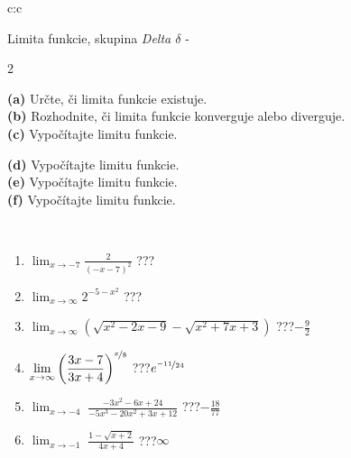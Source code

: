 \documentclass[10pt]{report}
\begin{document}
\begin{tabular}{c:c}
\begin{minipage}[c][104.5mm][t]{0.5\linewidth}
\begin{center}
\vspace{7mm}
{\huge Limita funkcie, skupina \textit{Delta $\delta$} -}\\[5mm]
\begin{minipage}{0.95\linewidth}
\begin{center}
{\small \begin{multicols}{2} \raggedright
\textbf{(a)} Určte, či limita funkcie existuje. \\[1mm]
\textbf{(b)} Rozhodnite, či limita funkcie konverguje alebo diverguje. \\[1mm]
\textbf{(c)} Vypočítajte limitu funkcie. \par \columnbreak
\textbf{(d)} Vypočítajte limitu funkcie. \\[1mm]
\textbf{(e)} Vypočítajte limitu funkcie. \\[1mm]
\textbf{(f)} Vypočítajte limitu funkcie. \\[1mm]
\end{multicols}
}
\end{center}
\end{minipage}
\\[4mm]
\begin{minipage}{0.79\linewidth}
\begin{center}
\begin{varwidth}{\linewidth}
\begin{enumerate}
\normalsize
\item $\displaystyle\lim_{x\to-7}{\frac{2}{(-x-7)^{2}}}$\quad \dotfill\; ???\;\dotfill \quad {}
\item $\displaystyle\lim_{x\to\infty}{2^{-5-x^2}}$\quad \dotfill\; ???\;\dotfill \quad {}
\item $\displaystyle\lim_{x\to\infty}{\left(\sqrt{x^2-2x-9} - \sqrt{x^2+7x+3}\right)}$\quad \dotfill\; ???\;\dotfill \quad $-\frac{9}{2}$
\item $\displaystyle\lim_{x\to\infty}{\left( \frac{3x-7}{3x+4} \right)^{\nicefrac{x}{8}}}$\quad \dotfill\; ???\;\dotfill \quad $e^{\nicefrac{-11}{24}}$
\item $\displaystyle\lim_{x\to -4}{\;\frac{-3x^2-6x+24}{-5x^3-20x^2+3x+12}}$\quad \dotfill\; ???\;\dotfill \quad $-\frac{18}{77}$
\item $\displaystyle\lim_{x\to -1}{\;\frac{1-\sqrt{x+2}}{4x+4}}$\quad \dotfill\; ???\;\dotfill \quad $\infty$

\end{enumerate}
\end{varwidth}
\end{center}
\end{minipage}
\end{center}
\end{minipage}
\end{tabular}
\end{document}
